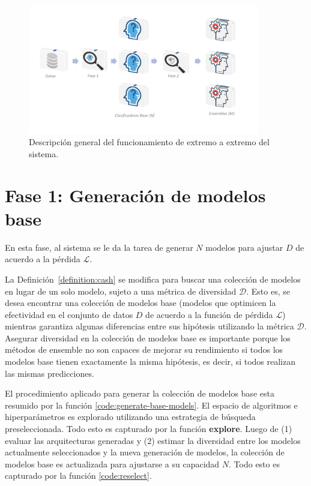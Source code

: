 \begin{figure}[h]
    \begin{center}
        \includegraphics[width=0.9\textwidth]{Graphics/overview.png}
    \end{center}
    \caption{Descripción general del funcionamiento de extremo a extremo del sistema.}
    \label{fig:overview}
\end{figure}


\section{Fase 1: Generación de modelos base}\label{section:first-phase}


En esta fase, al sistema se le da la tarea de generar $N$ modelos para ajustar $D$ de acuerdo a la pérdida $\mathcal{L}$.

La Definición~\ref{definition:cash} se modifica para buscar una colección de modelos en lugar de un solo modelo, sujeto a una métrica de diversidad $\mathcal{D}$.
Esto es, se desea encontrar una colección de modelos base (modelos que optimicen la efectividad en el conjunto de datos $D$ de acuerdo a la función de pérdida $\mathcal{L}$) mientras garantiza algunas diferencias entre sus hipótesis utilizando la métrica $\mathcal{D}$.
Asegurar diversidad en la colección de modelos base es importante porque los métodos de ensemble no son capaces de mejorar su rendimiento si todos los modelos base tienen exactamente la misma hipótesis, es decir, si todos realizan las mismas predicciones.

El procedimiento aplicado para generar la colección de modelos base esta resumido por la función \ref{code:generate-base-models}.
El espacio de algoritmos e hiperparámetros es explorado utilizando una estrategia de búsqueda preseleccionada.
Todo esto es capturado por la función \textbf{explore}.
Luego de (1) evaluar las arquitecturas generadas y (2) estimar la diversidad entre los modelos actualmente seleccionados y la nueva generación de modelos, la colección de modelos base es actualizada para ajustarse a su capacidad $N$.
Todo esto es capturado por la función \ref{code:reselect}.


